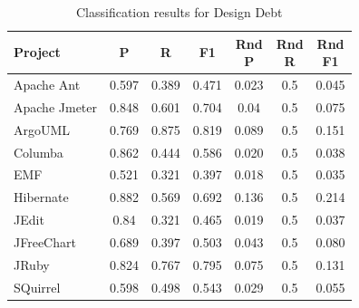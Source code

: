 \begin{table}[!hbt]
    \begin{center}
        \caption{Classification results for Design Debt}
        \label{tbl:classifier_results_design}
        \begin{tabular}{l| c c c c c c}
        \toprule
        \textbf{Project} & \textbf{P} & \textbf{R} & \textbf{F1} & \thead{Rnd\\P} & \thead{Rnd\\R} & \thead{Rnd\\F1} \\
        \midrule
        Apache Ant    &               0.597 &            0.389 &        0.471 &                     0.023 &                    0.5 &              0.045 \\
        Apache Jmeter &               0.848 &            0.601 &        0.704 &                     0.04  &                    0.5 &              0.075 \\
        ArgoUML       &               0.769 &            0.875 &        0.819 &                     0.089 &                    0.5 &              0.151 \\
        Columba       &               0.862 &            0.444 &        0.586 &                     0.020 &                    0.5 &              0.038 \\
        EMF           &               0.521 &            0.321 &        0.397 &                     0.018 &                    0.5 &              0.035 \\
        Hibernate     &               0.882 &            0.569 &        0.692 &                     0.136 &                    0.5 &              0.214 \\
        JEdit         &                0.84 &            0.321 &        0.465 &                     0.019 &                    0.5 &              0.037 \\
        JFreeChart    &               0.689 &            0.397 &        0.503 &                     0.043 &                    0.5 &              0.080 \\
        JRuby         &               0.824 &            0.767 &        0.795 &                     0.075 &                    0.5 &              0.131 \\
        SQuirrel      &               0.598 &            0.498 &        0.543 &                     0.029 &                    0.5 &              0.055 \\
        \bottomrule
        \end{tabular}
    \end{center}    
\end{table}

